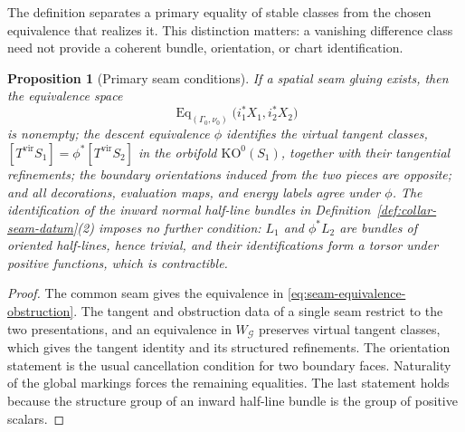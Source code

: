 \documentclass[11pt,letterpaper,twoside]{article}
\theoremstyle{plain}
\newtheorem{proposition}[theorem]{Proposition}
\theoremstyle{definition}
\theoremstyle{remark}
\begin{document}
The definition separates a primary equality of stable classes from the chosen equivalence that realizes it.  This distinction matters: a vanishing difference class need not provide a coherent bundle, orientation, or chart identification.

\begin{proposition}[Primary seam conditions]\label{prop:primary-seam-obstructions}
If a spatial seam gluing exists, then the equivalence space
\begin{equation}\label{eq:seam-equivalence-obstruction}
 \operatorname{Eq}_{(\Gamma_0,\nu_0)}
 \bigl(i_1^*X_1,i_2^*X_2\bigr)
\end{equation}
is nonempty; the descent equivalence \(\phi\) identifies the virtual tangent classes, \([T^{\mathrm{vir}}S_1]=\phi^*[T^{\mathrm{vir}}S_2]\) in the orbifold \(\mathrm{KO}^0(S_1)\), together with their tangential refinements; the boundary orientations induced from the two pieces are opposite; and all decorations, evaluation maps, and energy labels agree under \(\phi\).  The identification of the inward normal half-line bundles in Definition~\ref{def:collar-seam-datum}(2) imposes no further condition: \(L_1\) and \(\phi^*L_2\) are bundles of oriented half-lines, hence trivial, and their identifications form a torsor under positive functions, which is contractible.
\end{proposition}

\begin{proof}
The common seam gives the equivalence in \eqref{eq:seam-equivalence-obstruction}.  The tangent and obstruction data of a single seam restrict to the two presentations, and an equivalence in \(W_{\mathcal G}\) preserves virtual tangent classes, which gives the tangent identity and its structured refinements.  The orientation statement is the usual cancellation condition for two boundary faces.  Naturality of the global markings forces the remaining equalities.  The last statement holds because the structure group of an inward half-line bundle is the group of positive scalars.
\end{proof}
\end{document}
